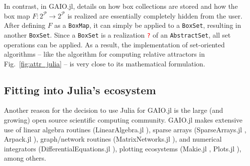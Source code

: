\documentclass{juliacon}
\newcommand{\cP}{\mathcal{P}}
\newcommand{\todo}[1]{\textcolor{red}{\texttt{#1}}}
\begin{document}
\begin{enumerate}
In contrast, in GAIO.jl, details on how box collections are stored and how the box map $F:2^\cP\to 2 ^\cP$ is realized are essentially completely hidden from the user. After defining $F$ as a \texttt{BoxMap}, it can simply be applied to a \texttt{BoxSet}, resulting in another \texttt{BoxSet}. Since a \texttt{BoxSet} is a realization \todo{?} of an \texttt{AbstractSet}, all set operations can be applied. As a result, the implementation of set-oriented algorithms -- like the algorithm for computing relative attractors in Fig.~\ref{fig:attr_julia} -- is very close to its mathematical formulation.

    
%    
%
\end{enumerate}


\subsection{Fitting into Julia's ecosystem}

Another reason for the decision to use Julia for GAIO.jl is the large (and growing) open source scientific computing community. GAIO.jl makes extensive use of linear algebra routines (LinearAlgebra.jl \cite{bezanson2017julia}), sparse arrays (SparseArrays.jl \cite{bezanson2017julia}, Arpack.jl \cite{arpack}), graph/network routines (MatrixNetworks.jl \cite{matrixnetworks}), and numerical integrators (DifferentialEquations.jl \cite{differentialequations}), plotting ecosystems (Makie.jl \cite{makie}, Plots.jl \cite{plots}), among others. 
\end{document}
